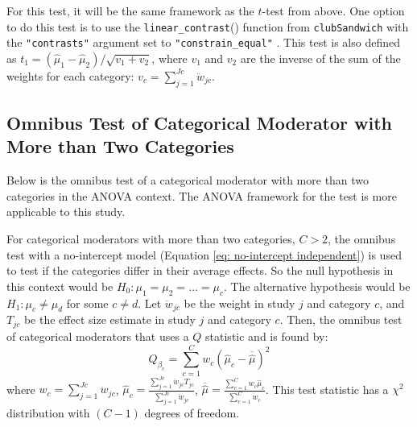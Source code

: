 For this test, it will be the same framework as the $t$-test from above. One option to do this test is to use the \texttt{linear\_contrast}() function from \texttt{clubSandwich} with the \texttt{"contrasts"} argument set to \texttt{"constrain\_equal"} \autocite{pustejovsky2024a}. This test is also defined as $t_1 = (\hat{\mu}_1 - \hat{\mu}_2)  / \sqrt{v_1 + v_2 }$, where $v_1$ and $v_2$ are the inverse of the sum of the weights for each category: $v_c = \sum_{j=1}^{Jc} \ddot{w}_{jc}$.





\subsection{Omnibus Test of Categorical Moderator with More than Two Categories}

Below is the omnibus test of a categorical moderator with more than two categories in the ANOVA context. The ANOVA framework for the test is more applicable to this study.  


For categorical moderators with more than two categories,  $C > 2$, the omnibus test with a no-intercept model (Equation \ref{eq: no-intercept independent}) is used to test if the categories differ in their average effects. So the null hypothesis in this context would be $H_0: \mu_{1} = \mu_{2} = \hdots = \mu_{c}$. The alternative hypothesis would be $H_1: \mu_c \neq \mu_d$ for some $c \neq d$. Let $\ddot{w}_{jc}$ be the weight in study $j$ and category $c$, and $T_{jc}$ be the effect size estimate in study $j$ and category $c$. Then, the omnibus test of categorical moderators that uses a $Q$ statistic and is found by: 
\begin{equation} \label{eq: Qstat}
    Q_{\beta_c} = \sum_{c=1}^C w_c(\hat{\mu}_{c} - \overline{\hat{\mu}})^2 
\end{equation}
where $w_c = \sum_{j=1}^{Jc} \ddot{w}_{jc}$, $\hat{\mu}_c = \frac{\sum_{j=1}^{Jc} \ddot{w}_{jc} T_{jc}}{\sum_{j=1}^{Jc} \ddot{w}_{jc}}$,  $\overline{\hat{\mu}} = \frac{\sum_{c=1}^C w_c \hat{\mu}_c}{\sum_{c=1}^C w_c}$. This test statistic has a $\chi^2$ distribution with $(C-1)$ degrees of freedom.


